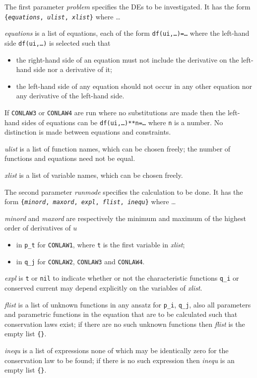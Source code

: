 The first parameter \textit{problem} specifies the DEs to be
investigated.  It has the form \texttt{\{\textit{equations},
  \textit{ulist}, \textit{xlist}\}} where \ldots
\begin{description}
\item{\textit{equations}} is a list of equations, each of the form
  \texttt{df(ui,\ldots)=\ldots} where the left-hand side
  \texttt{df(ui,\ldots)} is selected such that
  \begin{itemize}
  \item the right-hand side of an equation must not include the
    derivative on the left-hand side nor a derivative of it;
  \item the left-hand side of any equation should not occur in any
    other equation nor any derivative of the left-hand side.
  \end{itemize}
  If \texttt{CONLAW3} or \texttt{CONLAW4} are run where no
  substitutions are made then the left-hand sides of equations can be
  \texttt{df(ui,\ldots)**n=\ldots} where \texttt{n} is a number.  No
  distinction is made between equations and constraints.
\item{\textit{ulist}} is a list of function names, which can be chosen
  freely; the number of functions and equations need not be equal.
\item{\textit{xlist}} is a list of variable names, which can be chosen
  freely.
\end{description}

The second parameter \textit{runmode} specifies the calculation to be
done.  It has the form \texttt{\{\textit{minord}, \textit{maxord},
  \textit{expl}, \textit{flist}, \textit{inequ}\}} where \ldots
\begin{description}
\item{\textit{minord} and \textit{maxord}} are respectively the
  minimum and maximum of the highest order of derivatives of $u$
  \begin{itemize}
  \item in \texttt{p\_t} for \texttt{CONLAW1}, where \texttt{t} is the
    first variable in \textit{xlist};
  \item in \texttt{q\_j} for \texttt{CONLAW2}, \texttt{CONLAW3} and
    \texttt{CONLAW4}.
  \end{itemize}
\item{\textit{expl}} is \texttt{t} or \texttt{nil} to indicate whether
  or not the characteristic functions \texttt{q\_i} or conserved
  current may depend explicitly on the variables of \textit{xlist}.
\item{\textit{flist}} is a list of unknown functions in any ansatz for
  \texttt{p\_i}, \texttt{q\_j}, also all parameters and parametric
  functions in the equation that are to be calculated such that
  conservation laws exist; if there are no such unknown functions then
  \textit{flist} is the empty list \texttt{\{\}}.
\item{\textit{inequ}} is a list of expressions none of which may be
  identically zero for the conservation law to be found; if there is
  no such expression then \textit{inequ} is an empty list
  \texttt{\{\}}.
\end{description}

